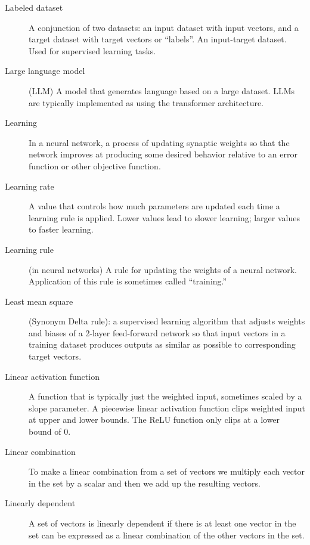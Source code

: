 \begin{description}

\item[Labeled dataset] A conjunction of two datasets: an input dataset with input vectors, and a target dataset with target vectors or ``labels''. An input-target dataset. Used for supervised learning tasks.  

\item[Large language model] (LLM) A model that generates language based on a large dataset.  LLMs are typically implemented as using the transformer architecture.

\item[Learning] In a neural network, a process of updating synaptic weights so that the network improves at producing some desired behavior relative to an error function or other objective function.

\item[Learning rate] A value that controls how much parameters are updated each time a learning rule is applied. Lower values lead to slower learning; larger values to faster learning.

\item[Learning rule] (in neural networks) A rule for updating the weights of a neural network. Application of this rule is sometimes called ``training.''

\item[Least mean square] (Synonym Delta rule): a supervised learning algorithm that adjusts weights and biases of a 2-layer feed-forward network so that input vectors in a training dataset produces outputs as similar as possible to corresponding target vectors.

\item[Linear activation function] A function that is typically just the weighted input, sometimes scaled by a slope parameter. A piecewise linear activation function clips weighted input at  upper and lower bounds. The ReLU function only clips at a lower bound of 0.

\item[Linear combination] To make a linear combination from a set of vectors we multiply each vector in the set by a scalar and then we add up the resulting vectors.

\item[Linearly dependent] A set of vectors is linearly dependent if there is at least one vector in the set can be expressed as a linear combination of the other vectors in the set.


\end{description}
